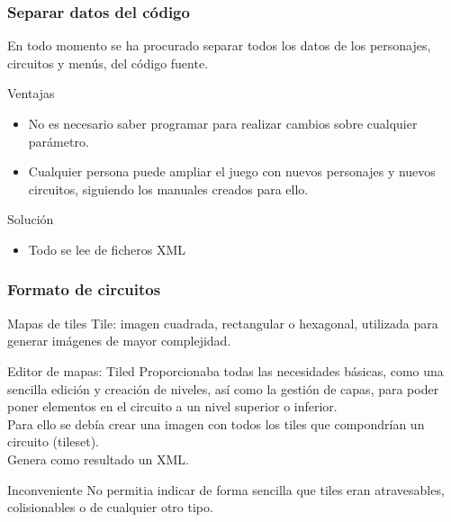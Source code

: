 \begin{frame}
    \frametitle{Separar datos del código}

        En todo momento se ha procurado separar todos los datos de los personajes, circuitos y menús, del código
        fuente.\\
        \begin{block}{Ventajas}
            \begin{itemize}
                \item No es necesario saber programar para realizar cambios sobre cualquier parámetro.
                \item Cualquier persona puede ampliar el juego con nuevos personajes y nuevos circuitos, siguiendo
                los manuales creados para ello.
            \end{itemize}
        \end{block}
        \begin{block}{Solución}
            \begin{itemize}
                \item Todo se lee de ficheros XML
            \end{itemize}
        \end{block}

\end{frame}

\begin{frame}
    \frametitle{Formato de circuitos}

    \begin{block}{Mapas de tiles}
        Tile: imagen cuadrada, rectangular o hexagonal, utilizada para generar imágenes de mayor complejidad.
    \end{block}   
    
    \begin{block}{Editor de mapas: Tiled}
    Proporcionaba todas las necesidades básicas, 
    como una sencilla edición y creación de niveles, así como la gestión de capas,
    para poder poner elementos en el circuito a un nivel superior o inferior.\\
    Para ello se debía crear una imagen con todos los tiles que compondrían un circuito (tileset).\\
    Genera como resultado un XML.
    \end{block}   

    \begin{block}{Inconveniente}
        No permitia indicar de forma sencilla que tiles eran atravesables, colisionables o de cualquier otro tipo.
    \end{block}

\end{frame}

